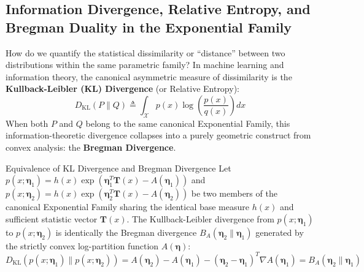 \subsection{Information Divergence, Relative Entropy, and Bregman Duality in the Exponential Family}
How do we quantify the statistical dissimilarity or ``distance'' between two distributions within the same parametric family?
In machine learning and information theory, the canonical asymmetric measure of dissimilarity is the \textbf{Kullback-Leibler (KL) Divergence} (or Relative Entropy):
\begin{equation}
D_{\text{KL}}(P \parallel Q) \triangleq \int_{\mathcal{X}} p(x) \log\left( \frac{p(x)}{q(x)} \right) dx
\label{eq:kl_divergence_def}
\end{equation}
When both $P$ and $Q$ belong to the same canonical Exponential Family, this information-theoretic divergence collapses into a purely geometric construct from convex analysis: the \textbf{Bregman Divergence}.

\begin{theorembox}{Equivalence of KL Divergence and Bregman Divergence}
Let $p(x; \boldsymbol{\eta}_1) = h(x)\exp(\boldsymbol{\eta}_1^T \mathbf{T}(x) - A(\boldsymbol{\eta}_1))$ and $p(x; \boldsymbol{\eta}_2) = h(x)\exp(\boldsymbol{\eta}_2^T \mathbf{T}(x) - A(\boldsymbol{\eta}_2))$ be two members of the canonical Exponential Family sharing the identical base measure $h(x)$ and sufficient statistic vector $\mathbf{T}(x)$.
The Kullback-Leibler divergence from $p(x; \boldsymbol{\eta}_1)$ to $p(x; \boldsymbol{\eta}_2)$ is identically the Bregman divergence $B_A(\boldsymbol{\eta}_2 \parallel \boldsymbol{\eta}_1)$ generated by the strictly convex log-partition function $A(\boldsymbol{\eta})$:
\begin{equation}
D_{\text{KL}}\left( p(x; \boldsymbol{\eta}_1) \parallel p(x; \boldsymbol{\eta}_2) \right) = A(\boldsymbol{\eta}_2) - A(\boldsymbol{\eta}_1) - (\boldsymbol{\eta}_2 - \boldsymbol{\eta}_1)^T \nabla A(\boldsymbol{\eta}_1) = B_A(\boldsymbol{\eta}_2 \parallel \boldsymbol{\eta}_1)
\label{eq:kl_bregman_duality}
\end{equation}
\end{theorembox}

